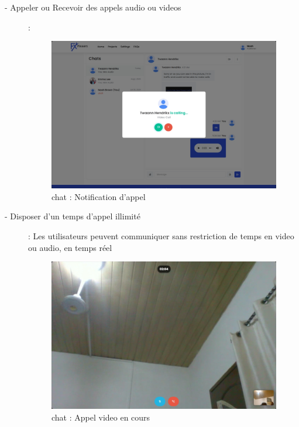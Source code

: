 \begin{description}
    \item[- Appeler ou Recevoir des appels audio ou videos] :

\vspace{0.35cm}
\begin{figure}[H]
\begin{center}
\includegraphics[width=12cm]{assets/demo/chat-3.png}
\end{center}
\caption{chat : Notification d'appel}
\end{figure}

    \item[- Disposer d'un temps d'appel illimité] : Les utilisateurs peuvent communiquer sans restriction de temps en video ou audio, en temps réel

\vspace{0.35cm}
\begin{figure}[H]
\begin{center}
\includegraphics[width=12cm]{assets/demo/chat-4.png}
\end{center}
\caption{chat : Appel video en cours}
\end{figure}
\end{description}


